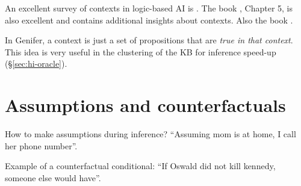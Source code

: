 An excellent survey of contexts in logic-based AI is \citep*{Akman1996}.  The book \citep*{Sowa2000}, Chapter 5, is also excellent and contains additional insights about contexts.  Also the book \citep*{Bonzon2000}.

In Genifer, a context is just a set of propositions that are \textit{true in that context}.  This idea is very useful in the clustering of the KB for inference speed-up (\S\ref{sec:hi-oracle}).

\section{Assumptions and counterfactuals}

How to make assumptions during inference?  ``Assuming mom is at home, I call her phone number''.

Example of a counterfactual conditional:  ``If Oswald did not kill kennedy, someone else would have''.
